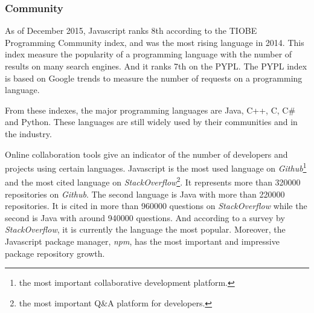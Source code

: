 \subsubsection{Community}%
As of December 2015, Javascript ranks 8th according to the TIOBE Programming Community index, and was the most rising language in 2014.
This index measure the popularity of a programming language with the number of results on many search engines.
And it ranks 7th on the PYPL.
The PYPL index is based on Google trends to measure the number of requests on a programming language.

From these indexes, the major programming languages are Java, C++, C, C\# and Python.
These languages are still widely used by their communities and in the industry.

\begin{figure}
\end{figure}


Online collaboration tools give an indicator of the number of developers and projects using certain languages.
Javascript is the most used language on \textit{Github}\footnote{the most important collaborative development platform.} and the most cited language on \textit{StackOverflow}\footnote{the most important Q\&A platform for developers.}.
It represents more than \num{320000} repositories on \textit{Github}.
The second language is Java with more than \num{220000} repositories.
It is cited in more than \num{960000} questions on \textit{StackOverflow} while the second is Java with around \num{940000} questions.
And according to a survey by \textit{StackOverflow}, it is currently the language the most popular.
Moreover, the Javascript package manager, \textit{npm}, has the most important and impressive package repository growth.

